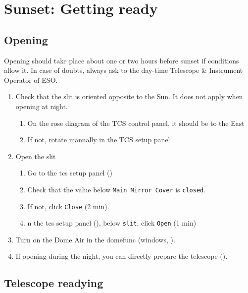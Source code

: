 \documentclass[11pt,fleqn,a4paper]{book}
\begin{document}

\chapter{Sunset: Getting ready}
\label{chap:sunset}

\section{Opening}
\label{sec:open}

Opening should take place about one or two hours before sunset if conditions allow it. In case of doubts, always ask to the day-time Telescope \& Instrument Operator of ESO.

\label{proc:open}
\begin{enumerate}
\item Check that the \gls{slit} is oriented opposite to the Sun. It does not apply when opening at night.
        \begin{enumerate}
            \item On the \gls{rose diagram} of the \gls{TCS control panel}, it should be to the East
            \item If not, rotate manually in the \gls{TCS setup panel}
        \end{enumerate}
\item Open the \gls{slit}\label{list:slitopen}
         \begin{enumerate}
           \item Go to the \gls{tcs} setup panel ()
           \item Check that the value below \texttt{Main Mirror Cover} is \texttt{closed}.
           \item If not, click \texttt{Close} (2 min).
           \item n the \gls{tcs} setup panel (), below \texttt{slit}, click \texttt{Open} (1 min)
         \end{enumerate} 
\item Turn on the Dome Air in the \gls{domefunc} (\gls{windows}, ).
\item If opening during the night, you can directly prepare the telescope ().
\end{enumerate}

\section{Telescope readying}
\end{document}
